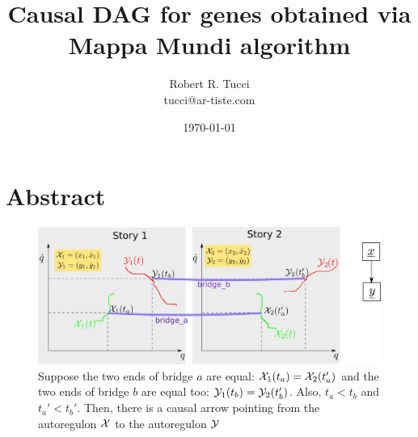 \documentclass[12pt]{article}
\begin{document}
\title{Causal DAG for genes obtained via Mappa Mundi algorithm}
\date{ \today}
\author{Robert R. Tucci\\
        tucci@ar-tiste.com}
\maketitle
\vskip2cm
\section*{Abstract}

\begin{figure}[h!]
\centering
\includegraphics[width=5in]
{two-phase-plane-bridges.png}
\caption{Suppose the two ends of bridge $a$ are equal: ${\cal X}_1(t_a)= {\cal X}_2(t_a')$ and
the two ends of bridge $b$ are equal too:
${\cal Y}_1(t_b)={\cal Y}_2(t_b')$. Also, $t_a<t_b$ and $t_a'<t_b'$. Then, there is a causal arrow pointing
from the autoregulon ${\cal X}$ to the autoregulon 
${\cal Y}$}
\label{fig-two-phase-plane-bridges}
\end{figure}
%
%
\end{document}
